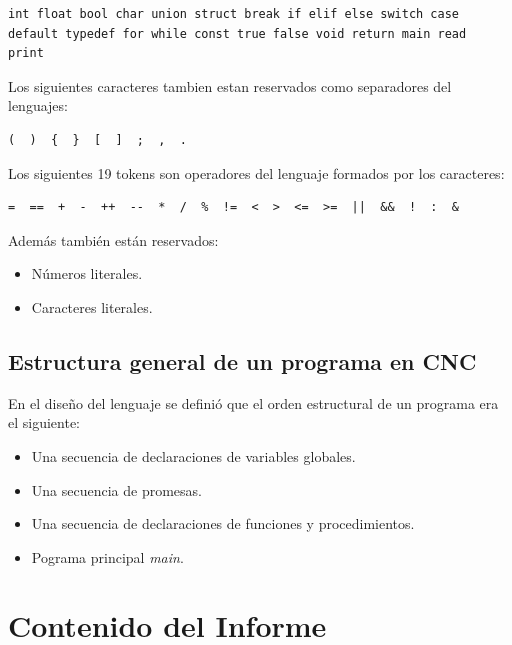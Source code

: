 \documentclass[11pt, spanish]{report}
\begin{document}
\begin{verbatim}
int float bool char union struct break if elif else switch case 
default typedef for while const true false void return main read 
print
\end{verbatim}

Los siguientes caracteres tambien estan reservados como separadores del lenguajes: 

\begin{verbatim}
(  )  {  }  [  ]  ;  ,  .
\end{verbatim}

Los siguientes 19 tokens son operadores del lenguaje formados por los caracteres: 

\begin{verbatim}
=  ==  +  -  ++  --  *  /  %  !=  <  >  <=  >=  ||  &&  !  :  &
\end{verbatim}

Adem\'as tambi\'en est\'an reservados:

\begin{itemize}
\item N\'umeros literales.
\item Caracteres literales.
\end{itemize}

\subsection{Estructura general de un programa en CNC}

En el dise\~no del lenguaje se defini\'o que el orden estructural de un programa era el siguiente:

\begin{itemize}
\item Una secuencia de declaraciones de variables globales.
\item Una secuencia de promesas.
\item Una secuencia de declaraciones de funciones y procedimientos.
\item Pograma principal \emph{main}.
\end{itemize}

\section{Contenido del Informe}
\end{document}
